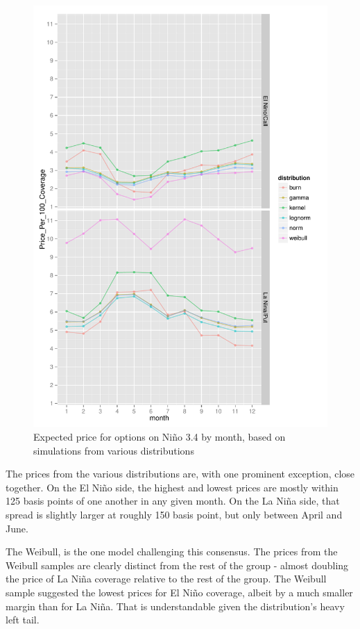 \documentclass[authoryear]{article}
\begin{document}
\begin{figure}[!htbp]
  \includegraphics[width=\linewidth]{Pricingfigs/optionPricesWithVariousDistMonth}
  \caption{Expected price for options on Ni\~no 3.4 by month, based on simulations from various distributions}
   \label{fig:optionPricesWithVariousDistMonth}
\end{figure}

The prices from the various distributions are, with one prominent exception, close together. On the El Ni\~no side, the highest and lowest prices are mostly within 125 basis points of one another in any given month. On the La Ni\~na side, that spread is slightly larger at roughly 150 basis point, but only between April and June.

The Weibull, is the one model challenging this consensus. The prices from the Weibull samples are clearly distinct from the rest of the group - almost doubling the price of La Ni\~na coverage relative to the rest of the group. The Weibull sample suggested the lowest prices for El Ni\~no coverage, albeit by a much smaller margin than for La Ni\~na. That is understandable given the distribution's heavy left tail.
\end{document}
